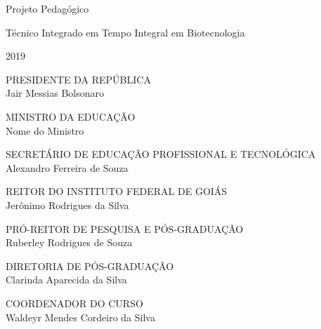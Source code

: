 \documentclass[11pt,fleqn]{book} %
\begin{document}
\let\cleardoublepage\clearpage

\renewcommand{\chaptername}{Capítulo}
\renewcommand{\figurename}{Fig.}

\begingroup
	\thispagestyle{empty}
	
	
	
	
	\vspace*{4.5cm}
	
	\centering
	\par
	{\Huge Projeto Pedagógico}\vspace*{1.5cm}
	\par
	\fontsize{40}{40}
	\selectfont
	Técnico Integrado em Tempo Integral em Biotecnologia\vspace*{10cm}
	\par
	{\Huge 2019}
	\par
\endgroup
\pagebreak

\begin{center}
	\par
	{\large PRESIDENTE DA REPÚBLICA \\ Jair Messias Bolsonaro}\vspace*{1cm}
	\par
	{\large MINISTRO DA EDUCAÇÃO \\ Nome do Ministro}\vspace*{1cm}
	\par
	{\large SECRETÁRIO DE EDUCAÇÃO PROFISSIONAL E TECNOLÓGICA \\ Alexandro Ferreira de Souza}\vspace*{1cm}
	\par
	{\large REITOR DO INSTITUTO FEDERAL DE GOIÁS \\ Jerônimo Rodrigues da Silva}\vspace*{1cm}
	\par
	{\large PRÓ-REITOR DE PESQUISA E PÓS-GRADUAÇÃO \\ Ruberley Rodrigues de Souza}\vspace*{1cm}
	\par
	{\large DIRETORIA DE PÓS-GRADUAÇÃO \\ Clarinda Aparecida da Silva}\vspace*{1cm}
	\par
	{\large COORDENADOR DO CURSO \\ Waldeyr Mendes Cordeiro da Silva}\vspace*{1cm}
\end{center}
\end{document}

